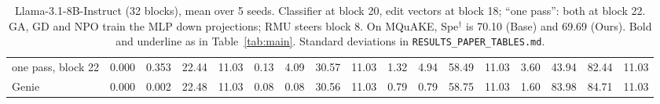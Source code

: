 \documentclass{article}
\theoremstyle{remark}
\theoremstyle{definition}
\begin{document}
\begin{table}[t]
\begin{tabular}{l cccc cccc cccc cccc}
\quad one pass, block 22 & 0.000 & 0.353 & 22.44 & 11.03 & 0.13 & 4.09 & 30.57 & 11.03 & 1.32 & 4.94 & 58.49 & 11.03 & 3.60 & 43.94 & 82.44 & 11.03 \\
Genie       & 0.000 & 0.002 & 22.48 & 11.03 & 0.08 & 0.08 & 30.56 & 11.03 & 0.79 & 0.79 & 58.75 & 11.03 & 1.60 & 83.98 & 84.71 & 11.03 \\
\bottomrule
\end{tabular}
\caption{Llama-3.1-8B-Instruct (32 blocks), mean over 5 seeds. Classifier at block 20, edit vectors at block 18; ``one pass'': both at block 22. GA, GD and NPO train the MLP down projections; RMU steers block 8. On MQuAKE, Spe$^\dagger$ is 70.10 (Base) and 69.69 (Ours). Bold and underline as in Table~\ref{tab:main}. Standard deviations in \texttt{RESULTS\_PAPER\_TABLES.md}.}
\label{tab:llama8b}
\end{table}
\end{document}
